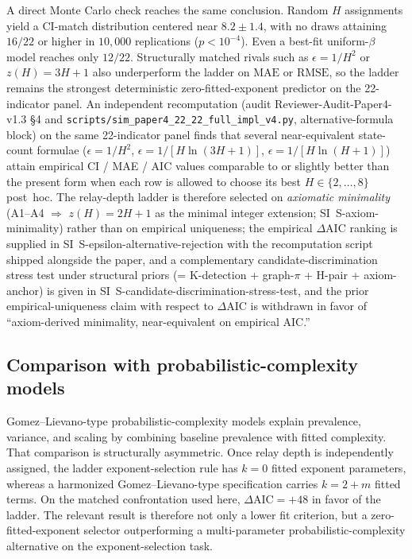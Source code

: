 A direct Monte Carlo check reaches the same conclusion. Random $H$
assignments yield a CI-match distribution centered near $8.2\pm1.4$, with no
draws attaining $16/22$ or higher in $10{,}000$ replications
($p<10^{-4}$). Even a best-fit uniform-$\beta$ model reaches only
$12/22$. Structurally matched rivals such as $\epsilon=1/H^2$ or
$z(H)=3H+1$ also underperform the ladder on $\mathrm{MAE}$ or
$\mathrm{RMSE}$, so the ladder remains the strongest deterministic
zero-fitted-exponent predictor on the 22-indicator panel.
An independent recomputation (audit Reviewer-Audit-Paper4-v1.3 §4
and \texttt{scripts/sim\_paper4\_22\_22\_full\_impl\_v4.py}, alternative-formula
block) on the same 22-indicator panel finds that several near-equivalent
state-count formulae ($\epsilon\!=\!1/H^{2}$, $\epsilon\!=\!1/[H\ln(3H+1)]$,
$\epsilon\!=\!1/[H\ln(H+1)]$) attain empirical CI / MAE / AIC values comparable
to or slightly better than the present form when each row is allowed to choose its
best $H\!\in\!\{2,\dots,8\}$ post~hoc. The relay-depth ladder is therefore selected on
\emph{axiomatic minimality} (A1--A4 $\Rightarrow$ $z(H)=2H+1$ as the minimal
integer extension; SI~\textsf{S-axiom-minimality}) rather than on empirical
uniqueness; the empirical $\Delta\mathrm{AIC}$ ranking is supplied in
SI~\textsf{S-epsilon-alternative-rejection} with the recomputation script
shipped alongside the paper, and a complementary candidate-discrimination
stress test under structural priors (= K-detection + graph-\(\pi\) + H-pair + axiom-anchor)
is given in SI~\textsf{S-candidate-discrimination-stress-test}, and the prior empirical-uniqueness claim with respect
to $\Delta\mathrm{AIC}$ is withdrawn in favor of ``axiom-derived minimality,
near-equivalent on empirical AIC.''

\subsection{Comparison with probabilistic-complexity models}
Gomez--Lievano-type probabilistic-complexity models explain prevalence,
variance, and scaling by combining baseline prevalence with fitted complexity.
That comparison is structurally asymmetric. Once relay depth is independently
assigned, the ladder exponent-selection rule has $k=0$ fitted exponent
parameters, whereas a harmonized Gomez--Lievano-type specification carries
$k=2+m$ fitted terms. On the matched confrontation used here,
$\Delta\mathrm{AIC}=+48$ in favor of the ladder. The relevant result is therefore
not only a lower fit criterion, but a zero-fitted-exponent selector outperforming a
multi-parameter probabilistic-complexity alternative on the exponent-selection
task.

